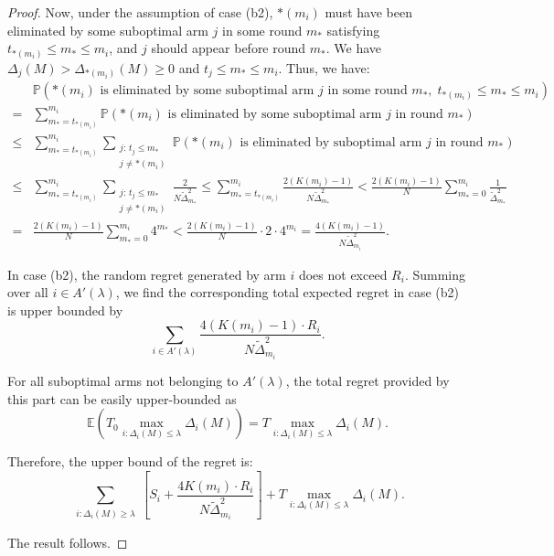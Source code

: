 \documentclass[
  12pt]{article}
\begin{document}
\begin{proof}
Now, under the assumption of case (b2), $*(m_i)$ must have been eliminated by some suboptimal arm $j$ in some round $m_*$ satisfying $t_{*(m_i)} \leq m_* \leq m_i$, and \( j \) should appear before round \( m_* \). We have \( \Delta_j(M) > \Delta_{*(m_i)}(M) \geq 0 \) and \( t_j \leq m_* \leq m_i \). Thus, we have: 
\begin{align*}
    &\mathbb{P}\left(*(m_i) \text{ is eliminated by some suboptimal arm } j \text{ in some round } m_*,\; t_{*(m_i)} \leq m_* \leq m_i\right)\\
    = &\sum_{m_* = t_{*(m_i)}}^{m_i} \mathbb{P}\left(*(m_i) \text{ is eliminated by some suboptimal arm } j \text{ in round } m_*\right) \\
\leq & \sum_{m_* = t_{*(m_i)}}^{m_i}\sum_{\substack{j :\,t_j\leq m_*\\j\neq *(m_i)}} \mathbb{P}\left(*(m_i) \text{ is eliminated by suboptimal arm } j \text{ in round } m_*\right) \\
\leq &\sum_{m_* = t_{*(m_i)}}^{m_i}\sum_{\substack{j :\,t_j\leq m_*\\j\neq *(m_i)}}\frac{2}{N \tilde{\Delta}_{m_*}^2}\leq \sum_{m_* = t_{*(m_i)}}^{m_i}   \frac{2\left(K(m_i)-1\right)}{N \tilde{\Delta}_{m_*}^2}<\frac{2\left(K(m_i)-1\right)}{N } \sum_{m_* = 0}^{m_i}   \frac{1}{ \tilde{\Delta}_{m_*}^2} \\
= & \frac{2\left(K(m_i)-1\right)}{N} \sum_{m_* = 0}^{m_i} 4^{m_*}< \frac{2\left(K(m_i)-1\right)}{N}\cdot 2\cdot4^{m_i}=\frac{4\left(K(m_i)-1\right)}{N\tilde{\Delta}_{m_i}^2}.
\end{align*}

In case (b2), the random regret generated by arm \( i \) does not exceed $R_i$. Summing over all $i\in A'(\lambda)$, we find the corresponding total expected regret in case (b2) is upper bounded by
\[\sum_{i \in A'(\lambda)} \frac{4\left(K(m_i)-1\right)\cdot R_i}{N\tilde{\Delta}_{m_i}^2}.\]

For all suboptimal arms not belonging to \( A'(\lambda) \), the total regret provided by this part can be easily upper-bounded as 
\[ \mathbb{E}(T_0\max_{i:\Delta_i(M)\leq \lambda}  \Delta_i(M)) =T\max_{i:\Delta_i(M)\leq \lambda}  \Delta_i(M). \] 

Therefore, the upper bound of the regret is:  
\[
 \sum_{\substack{i: \Delta_i(M) \geq \lambda}} \left[ S_i +\frac{4K(m_i)\cdot R_i}{N\tilde{\Delta}_{m_i}^2}\right] + T\max_{i:\Delta_i(M)\leq \lambda}  \Delta_i(M).
\]

The result follows.
\end{proof}
\end{document}
